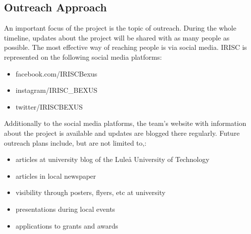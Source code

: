 
\subsection{Outreach Approach}
An important focus of the project is the topic of outreach. During the whole timeline, updates about the project will be shared with as many people as possible. The most effective way of reaching people is via social media. IRISC is represented on the following social media platforms:
\begin{itemize}
	\item facebook.com/IRISCBexus
	\item instagram/IRISC\_BEXUS
	\item twitter/IRISCBEXUS
\end{itemize}
Additionally to the social media platforms, the team's website with information about the project is available and updates are blogged there regularly.\newline\newline
Future outreach plans include, but are not limited to,:
\begin{itemize}
	\item articles at university blog of the Lule{\aa} University of Technology
	\item articles in local newspaper
	\item visibility through posters, flyers, etc at university
	\item presentations during local events
	\item applications to grants and awards
\end{itemize}

